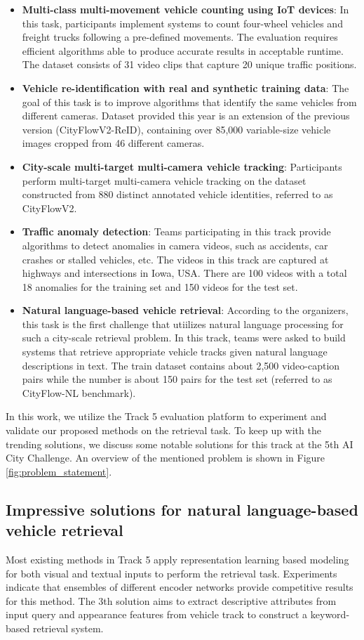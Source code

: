 \begin{itemize}
    \item \textbf{Multi-class multi-movement vehicle counting using IoT devices}: In this task, participants implement systems to count four-wheel vehicles and freight trucks following a pre-defined movements. The evaluation requires efficient algorithms able to produce accurate results in acceptable runtime. The dataset consists of 31 video clips that capture 20 unique traffic positions.
    \item \textbf{Vehicle re-identification with real and synthetic training data}: The goal of this task is to improve algorithms that identify the same vehicles from different cameras. Dataset provided this year is an extension of the previous version (CityFlowV2-ReID), containing over 85,000 variable-size vehicle images cropped from 46 different cameras. 
    \item \textbf{City-scale multi-target multi-camera vehicle tracking}: Participants perform multi-target multi-camera vehicle tracking on the dataset constructed from 880 distinct annotated vehicle identities, referred to as CityFlowV2. 
    \item \textbf{Traffic anomaly detection}: Teams participating in this track provide algorithms to detect anomalies in camera videos, such as accidents, car crashes or stalled vehicles, etc. The videos in this track are captured at highways and intersections in Iowa, USA. There are 100 videos with a total 18 anomalies for the training set and 150 videos for the test set. 
    \item \textbf{Natural language-based vehicle retrieval}: According to the organizers, this task is the first challenge that utiilizes natural language processing for such a city-scale retrieval problem. In this track, teams were asked to build systems that retrieve appropriate vehicle tracks given natural language descriptions in text. The train dataset contains about 2,500 video-caption pairs while the number is about 150 pairs for the test set (referred to as CityFlow-NL benchmark).
\end{itemize}
In this work, we utilize the Track 5 evaluation platform to experiment and validate our proposed methods on the retrieval task. To keep up with the trending solutions, we discuss some notable solutions for this track at the 5th AI City Challenge. An overview of the mentioned problem is shown in Figure \ref{fig:problem_statement}. \\
\subsection{Impressive solutions for natural language-based vehicle retrieval}
Most existing methods \cite{bai2021connecting, sun2021dun, nguyen2021contrastive, sebastian2021tied, nguyen2021traffic} in Track 5 apply representation learning based modeling for both visual and textual inputs to perform the retrieval task. Experiments indicate that ensembles of different encoder networks provide competitive results for this method.
The 3th solution \cite{park2021keyword} aims to extract descriptive attributes from input query and appearance features from vehicle track to construct a keyword-based retrieval system.

